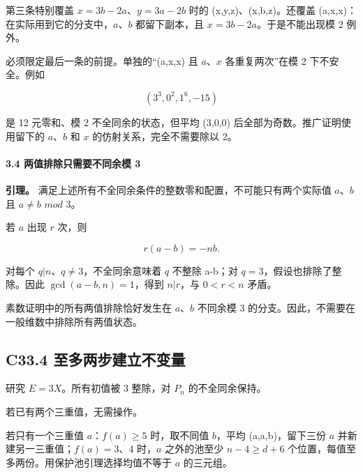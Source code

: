 \documentclass[11pt,a4paper]{article}
\theoremstyle{definition}
\numberwithin{equation}{section}
\begin{document}
{第三条特别覆盖} {\ensuremath{x=3b-2a}、\ensuremath{y=3a-2b}} {时的} {(x,y,z)、(x,b,z)。还覆盖} {(a,x,x)：在实际用到它的分支中，\ensuremath{a}、\ensuremath{b}} {都留下副本，且} {\ensuremath{x=3b-2a}。于是不能出现模} {2} {例外。}

{必须限定最后一条的前提。单独的``(a,x,x)} {且} {\ensuremath{a}、\ensuremath{x}} {各重复两次''在模} {2} {下不安全。例如}

\[
(3^3,0^2,1^6,-15)
\]

{是} {12} {元零和、模} {2} {不全同余的状态，但平均} {(3,0,0)} {后全部为奇数。推广证明使用留下的} {\ensuremath{a}、\ensuremath{b}} {和} {\ensuremath{x}} {的仿射关系，完全不需要除以} {2。}

\paragraph*{\texorpdfstring{{3.4} {两值排除只需要不同余模} {3}}{3.4 两值排除只需要不同余模 3}}\label{C33-h217}

\textbf{{引理。}} {满足上述所有不全同余条件的整数零和配置，不可能只有两个实际值} {\ensuremath{a}、\ensuremath{b}} {且} {\ensuremath{a\ne b}} {\ensuremath{mod}} {3。}

{若} {\ensuremath{a}} {出现} {\ensuremath{r}} {次，则}

\[
r(a-b)=-nb.
\]

{对每个} {\ensuremath{q|n}、\ensuremath{q\ne 3}，不全同余意味着} {\ensuremath{q}} {不整除} {a-b；对} {\ensuremath{q=3}，假设也排除了整除。因此} {\ensuremath{\operatorname{gcd}(a-b,n)=1}，得到} {\ensuremath{n|r}，与} {\ensuremath{0<r<n}} {矛盾。}

{素数证明中的所有两值排除恰好发生在} {\ensuremath{a}、\ensuremath{b}} {不同余模} {3} {的分支。因此，不需要在一般维数中排除所有两值状态。}

\subsection*{\texorpdfstring{{C33.4} {至多两步建立不变量}}{C33.4 至多两步建立不变量}}\label{C33-h218}

{研究} {\ensuremath{E=3X}。所有初值被} {3} {整除，对} {\ensuremath{P_{n}}} {的不全同余保持。}

{若已有两个三重值，无需操作。}

{若只有一个三重值} {\ensuremath{a}：\ensuremath{f(a)\ge 5}} {时，取不同值} {\ensuremath{b}，平均} {(a,a,b)，留下三份} {\ensuremath{a}} {并新建另一三重值；\ensuremath{f(a)=3}、4} {时，\ensuremath{a}} {之外的池至少} {\ensuremath{n-4\ge d+6}} {个位置，每值至多两份。用保护池引理选择均值不等于} {\ensuremath{a}} {的三元组。}
\end{document}
